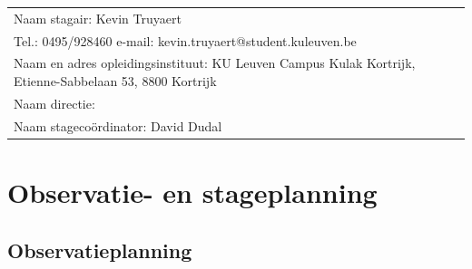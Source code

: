 
\begin{landscape}
	
	\begin{tabularx}{1.56\textwidth}{|X|}
		\hline
		Naam stagair:  Kevin Truyaert  \\
		Tel.: 0495/928460 \hspace{3cm} e-mail: kevin.truyaert@student.kuleuven.be  \\
		Naam en adres opleidingsinstituut:  KU Leuven Campus Kulak Kortrijk, Etienne-Sabbelaan 53, 8800 Kortrijk  \\
		Naam directie: \\
		Naam stagecoördinator:  David Dudal \\
		\hline
	\end{tabularx}
	\vspace*{-0.4cm}
\section{Observatie- en stageplanning}
\vspace*{-0.3cm}\subsection{Observatieplanning}

\end{landscape}
